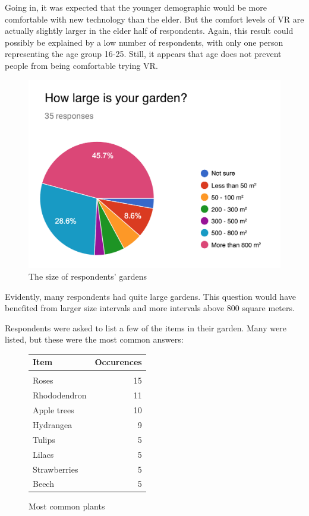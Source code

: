 Going in, it was expected that the younger demographic would be more comfortable with new technology than the elder. But the comfort levels of VR are actually slightly larger in the elder half of respondents. Again, this result could possibly be explained by a low number of respondents, with only one person representing the age group 16-25. Still, it appears that age does not prevent people from being comfortable trying VR.

\begin{figure}[H]
	\centering
	\includegraphics[width=0.6\linewidth]{figure/Analysis/gardensize.png}
	\caption{The size of respondents' gardens}
	\label{fig:gardensize}
\end{figure}

Evidently, many respondents had quite large gardens. This question would have benefited from larger size intervals and more intervals above 800 square meters.

Respondents were asked to list a few of the items in their garden. Many were listed, but these were the most common answers:
\begin{figure}[H]
	\begin{center}
		\begin{tabular}{  l  r }
			
			Item & Occurences  \\ \hline
			& \\
			Roses & 15 \\ 
			Rhododendron & 11  \\ 
			Apple trees & 10  \\ 
			Hydrangea & 9  \\ 
			Tulips & 5  \\ 
			Lilacs & 5  \\ 
			Strawberries & 5  \\ 
			Beech & 5  \\
		\end{tabular}
	\end{center}
	\caption{Most common plants}
	\label{fig:plantlist}
\end{figure}

